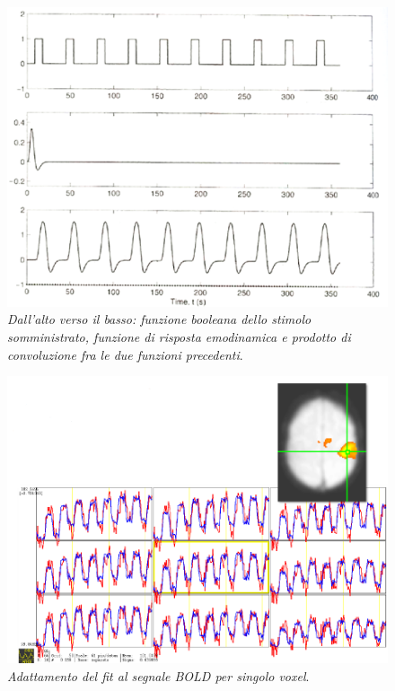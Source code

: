 \documentclass{report}
\numberwithin{equation}{section}
\numberwithin{figure}{section}
\begin{document}
\begin{figure}[htp]
\centering
\includegraphics[scale=0.68]{immagini/conv.png}
\caption{\label{fig:conv} \textit{Dall'alto verso il basso: funzione booleana dello stimolo somministrato, funzione di risposta emodinamica e prodotto di convoluzione fra le due funzioni precedenti}.}
\end{figure}

\begin{figure}[H]
\centering
\includegraphics[scale=0.69]{immagini/modello.png}
\caption{\label{fig:modello} \textit{Adattamento del fit al segnale BOLD per singolo voxel}.}
\end{figure}
\end{document}
